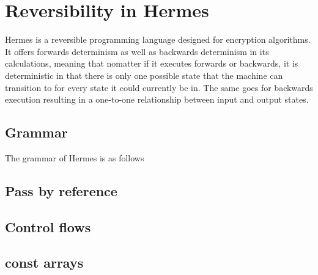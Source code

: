 \section{Reversibility in Hermes}
Hermes is a reversible programming language designed for encryption algorithms. It offers forwards determinism as well as backwards determinism in its calculations, meaning that nomatter if it executes forwards or backwards, it is deterministic in that there is only one possible state that the machine can transition to for every state it could currently be in. The same goes for backwards execution resulting in a one-to-one relationship between input and output states.



\subsection{Grammar}
The grammar of Hermes is as follows 

\subsection{Pass by reference}

\subsection{Control flows}


\subsection{const arrays}
